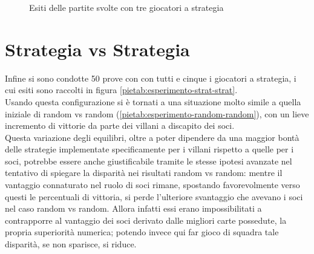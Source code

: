 \begin{figure}[!htb]
\label{piech:ultimo-vill}
\caption{Esiti delle partite svolte con tre giocatori a strategia}
\end{figure}












\section{Strategia vs Strategia}

Infine si sono condotte 50 prove con con tutti e cinque i giocatori a strategia, i cui esiti sono raccolti in figura \ref{pietab:esperimento-strat-strat}.\\
Usando questa configurazione si è tornati a una situazione molto simile a quella iniziale di random vs random (\ref{pietab:esperimento-random-random}), con un lieve incremento di vittorie da parte dei villani a discapito dei soci.\\
Questa variazione degli equilibri, oltre a poter dipendere da una maggior bontà delle strategie implementate specificamente per i villani rispetto a quelle per i soci, potrebbe essere anche giustificabile tramite le stesse ipotesi avanzate nel tentativo di spiegare la disparità nei risultati random vs random: mentre il vantaggio connaturato nel ruolo di soci rimane, spostando favorevolmente verso questi le percentuali di vittoria, si perde l'ulteriore svantaggio che avevano i soci nel caso random vs random.
Allora infatti essi erano impossibilitati a contrapporre al vantaggio dei soci derivato dalle migliori carte possedute, la propria superiorità numerica; potendo invece qui far gioco di squadra tale disparità, se non sparisce, si riduce.


